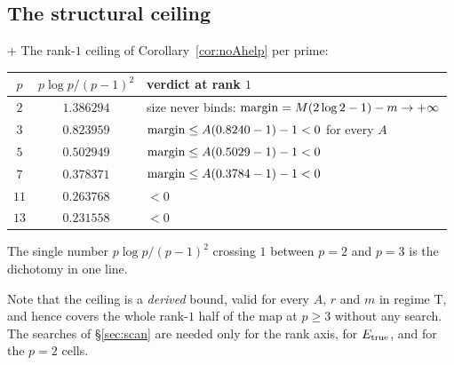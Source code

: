 \begin{center}\end{center}

\subsection{The structural ceiling}\label{ss:ceiling}

\begin{finding}\label{find:ceiling}
\DERIVED{} +  The rank-$1$ ceiling of Corollary~\ref{cor:noAhelp} per prime:
\begin{center}
\tabsmall
\begin{tabular}{ccl}
\toprule
$p$ & $p\log p/(p-1)^2$ & verdict at rank $1$\\
\midrule
$2$ & $1.386294$ & size never binds: $\operatorname{margin}=M(2\log2-1)-m\to+\infty$\\
$3$ & $0.823959$ & $\operatorname{margin}\le A(0.8240-1)-1<0$ for every $A$\\
$5$ & $0.502949$ & $\operatorname{margin}\le A(0.5029-1)-1<0$\\
$7$ & $0.378371$ & $\operatorname{margin}\le A(0.3784-1)-1<0$\\
$11$ & $0.263768$ & $<0$\\
$13$ & $0.231558$ & $<0$\\
\bottomrule
\end{tabular}
\end{center}
The single number $p\log p/(p-1)^2$ crossing $1$ between $p=2$ and $p=3$ is the dichotomy in
one line.
\end{finding}

Note that the ceiling is a \emph{derived} bound, valid for every $A$, $r$ and $m$ in regime
T, and hence covers the whole rank-$1$ half of the map at $p\ge3$ without any search. The
searches of \S\ref{sec:scan} are needed only for the rank axis, for $E_{\mathrm{true}}$, and for the
$p=2$ cells.
